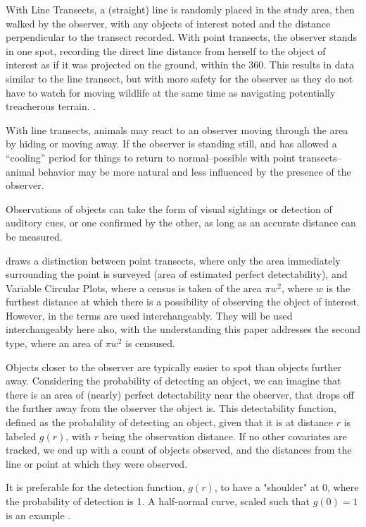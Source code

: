 \documentclass[12pt]{article}
\begin{document}
With Line Transects, a (straight) line is randomly placed in the study area, then walked by the observer, with any objects of interest noted and the distance perpendicular to the transect recorded. With point transects, the observer stands in one spot, recording the direct line distance from herself to the object of interest as if it was projected on the ground, within the 360\textdegree. This results in data similar to the line transect, but with more safety for the observer as they do not have to watch for moving wildlife at the same time as navigating potentially treacherous terrain. \cite{ramsey1979}.

With line transects, animals may react to an observer moving through the area by hiding or moving away. If the observer is standing still, and has allowed a ``cooling'' period for things to return to normal--possible with point transects--animal behavior may be more natural and less influenced by the presence of the observer.

Observations of objects can take the form of visual sightings or detection of auditory cues, or one confirmed by the other, as long as an accurate distance can be measured.

\textcite{buckland2001} draws a distinction between point transects, where only the area immediately surrounding the point is surveyed (area of estimated perfect detectability), and Variable Circular Plots, where a census is taken of the area $\pi w^2$, where $w$ is the furthest distance at which there is a possibility of observing the object of interest. However, in \textcite{buckland2006, quang1993} the terms are used interchangeably. They will be used interchangeably here also, with the understanding this paper addresses the second type, where an area of $\pi w^2$ is censused.

Objects closer to the observer are typically easier to spot than objects further away. Considering the probability of detecting an object, we can imagine that there is an area of (nearly) perfect detectability near the observer, that drops off the further away from the observer the object is. This detectability function, defined as the probability of detecting an object, given that it is at distance $r$ is labeled $g(r)$, with $r$ being the observation distance. If no other covariates are tracked, we end up with a count of objects observed, and the distances from the line or point at which they were observed.

It is preferable for the detection function, $g(r)$, to have a "shoulder" at 0, where the probability of detection is 1. A half-normal curve, scaled such that $g(0)=1$ is an example \parencite{buckland2001}.
\end{document}
